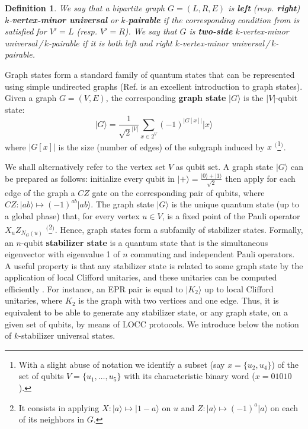 \documentclass[10pt,a4paper]{article}
\newtheorem{definition}{Definition}[section]
\newcommand{\ket}[1]{{\ensuremath{\lvert#1\rangle}}}
\begin{document}
\begin{definition} \label{def:bipartite-kvmu-kpair}
    We say that a bipartite graph $G = (L, R, E)$ is \textbf{left} (resp. \textbf{right}) $k$-\textbf{vertex-minor universal} or $k$-\textbf{pairable} if the corresponding condition from  is satisfied for $V' = L$ (resp. $V' = R$). We say that $G$ is \textbf{two-side} $k$-vertex-minor universal\,/\,$k$-pairable if it is both left and right $k$-vertex-minor universal\,/\,$k$-pairable.
\end{definition}

Graph states form a standard family of quantum states that can be represented using simple undirected graphs (Ref. \cite{Hein06} is an excellent introduction to graph states). Given a graph $G=(V,E)$, the corresponding \textbf{graph state} $\ket G$ is the $|V|$-qubit state: $$\ket G=\frac{1}{\sqrt 2^{|V|}}\sum_{x\in 2^V} (-1)^{|G[x]|}\ket x$$ where $|G[x]|$ is the size (number of edges) of the subgraph induced by $x$ $^($\footnote{With a slight abuse of notation we identify a subset (say $x=\{u_2,u_4\}$) of the set of qubits $V=\{u_1,\ldots ,u_5\}$ with its characteristic binary word  ($x=01010$).}$^)$. 

We shall alternatively refer to the vertex set $V$ as qubit set. A graph state $\ket G$ can be prepared as follows: initialize every qubit in  $\ket + = \frac{\ket 0+\ket 1}{\sqrt 2}$ then apply for each edge of the graph a $CZ$ gate on the corresponding pair of qubits, where  $CZ: \ket{ab}\mapsto (-1)^{ab}\ket{ab}$. The graph state $\ket G$ is the unique quantum state (up to a global phase) that, for every vertex $u\in V$, is a fixed point of the Pauli operator $X_uZ_{N_G(u)}$ $^($\footnote{It consists in applying $X:\ket a\mapsto \ket {1{-}a}$ on $u$ and $Z:\ket a \mapsto (-1)^a\ket a$ on each of its neighbors in $G$.}$^)$. Hence, graph states form a subfamily of stabilizer states. Formally, an $n$-qubit \textbf{stabilizer state} \cite{gottesman1998heisenberg} is a quantum state that is the simultaneous eigenvector with eigenvalue 1 of $n$ commuting and independent Pauli operators. A useful property is that any stabilizer state is related to some graph state by the application of local Clifford unitaries, and these unitaries can be computed efficiently \cite{VandenNest04}. For instance, an EPR pair is equal to $\ket{K_2}$ up to local Clifford unitaries, where $K_2$ is the graph with two vertices and one edge. Thus, it is equivalent to be able to generate any stabilizer state, or any graph state, on a given set of qubits, by means of LOCC protocols. We introduce below the notion of $k$-stabilizer universal states. 
\end{document}
